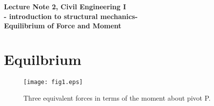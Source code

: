 \documentclass[10pt,a4j]{article}
\newlength{\minitwocolumn}
\begin{document}
\newcommand{\fat}[1]{\mbox{\boldmath $#1$}}
\newcommand{\D}{\partial}
\newcommand{\w}{\omega}
\newcommand{\ga}{\alpha}
\newcommand{\gb}{\beta}
\newcommand{\gx}{\xi}
\newcommand{\gz}{\zeta}
\newcommand{\vhat}[1]{\hat{\fat{#1}}}
\newcommand{\spc}{\vspace{0.7\baselineskip}}
\newcommand{\halfspc}{\vspace{0.3\baselineskip}}

\newcommand{\twofig}[2]
 {
   \begin{figure}
     \begin{minipage}[t]{\minitwocolumn}
         \begin{center}   #1
         \end{center}
     \end{minipage}
         \hspace{\columnsep}
     \begin{minipage}[t]{\minitwocolumn}
         \begin{center} #2
         \end{center}
     \end{minipage}
   \end{figure}
 }
\begin{center}
	{\Large \bf Lecture Note 2, Civil Engineering I \\
	- introduction to structural mechanics-\\
	Equilibrium of Force and Moment
	}  \\
\end{center}
\vspace{1.5cm}
\setcounter{section}{1}
\section{Equilbrium}
\begin{figure}[h]
	\begin{center}
	\texttt{[image: fig1.eps]} 
	\end{center}
	\caption{Three equivalent forces in terms of the moment about pivot P.} 
	\label{fig:fig1}
\end{figure}
\end{document}
